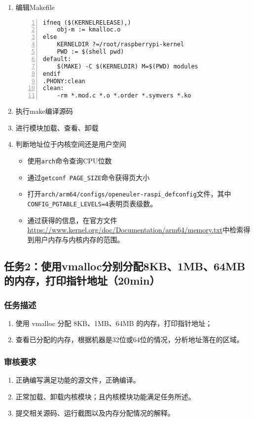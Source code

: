 \documentclass{article}
\begin{document}
\begin{enumerate}
\begin{lstlisting}[numbers=left]
\end{lstlisting}
	\item 编辑Makefile
	      \begin{lstlisting}[numbers=left]
ifneq ($(KERNELRELEASE),)
	obj-m := kmalloc.o
else
	KERNELDIR ?=/root/raspberrypi-kernel
	PWD := $(shell pwd)
default:
	$(MAKE) -C $(KERNELDIR) M=$(PWD) modules
endif
.PHONY:clean
clean:
	-rm *.mod.c *.o *.order *.symvers *.ko
    \end{lstlisting}
	\item 执行make编译源码
	\item 进行模块加载、查看、卸载
	\item 判断地址位于内核空间还是用户空间
	      \begin{itemize}
		      \item 使用\verb|arch|命令查询CPU位数
		      \item 通过\verb|getconf PAGE_SIZE|命令获得页大小
		      \item 打开\verb|arch/arm64/configs/openeuler-raspi_defconfig|文件，其中\\ \verb|CONFIG_PGTABLE_LEVELS=4|表明页表级数。
		      \item 通过获得的信息，在官方文件\url{https://www.kernel.org/doc/Documentation/arm64/memory.txt}中检索得到用户内存与内核内存的范围。
	      \end{itemize}
\end{enumerate}
\newpage

\subsection{任务2：使用vmalloc分别分配8KB、1MB、64MB的内存，打印指针地址（20min）}
\subsubsection{任务描述}
\begin{enumerate}
	\item 使用 vmalloc 分配 8KB、1MB、64MB 的内存，打印指针地址；
	\item 查看已分配的内存，根据机器是32位或64位的情况，分析地址落在的区域。
\end{enumerate}
\subsubsection{审核要求}
\begin{enumerate}
	\item 正确编写满足功能的源文件，正确编译。
	\item 正常加载、卸载内核模块；且内核模块功能满足任务所述。
	\item 提交相关源码、运行截图以及内存分配情况的解释。
\end{enumerate}
\end{document}
